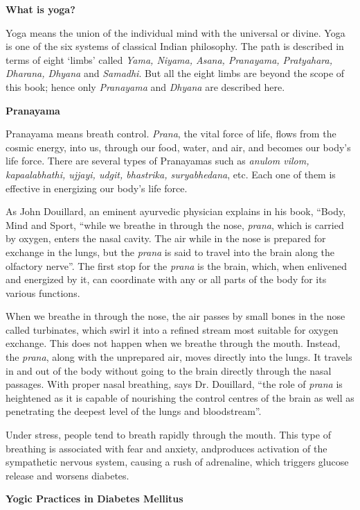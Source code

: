 \noindent\textbf{What is yoga?}

Yoga means the union of the individual mind with the universal or divine. Yoga is one of the six systems of classical Indian philo\-sophy. The path is described in terms of eight ‘limbs’ called \textit{Yama, Niyama, Asana, Pranayama, Pratyahara, Dharana, Dhyana} and \textit{Samadhi}. But all the eight limbs are beyond the scope of this book; hence only \textit{Pranayama} and \textit{Dhyana} are described here.

\noindent\textbf{Pranayama}

Pranayama means breath control. \textit{Prana}, the vital force of life, flows from the cosmic energy, into us, through our food, water, and air, and becomes our body’s life force. There are several types of Pranayamas such as \textit{anulom vilom, kapaalabhathi, ujjayi, udgit, bhastrika, suryabhedana}, etc. Each one of them is effective in energizing our body’s life force.

As John Douillard, an eminent ayurvedic physician explains in his book, “Body, Mind and Sport, “while we breathe in through the nose, \textit{prana}, which is carried by oxygen, enters the nasal cavity. The air while in the nose is prepared for exchange in the lungs, but the \textit{prana} is said to travel into the brain along the olfactory nerve”. The first stop for the \textit{prana} is the brain, which, when enlivened and energized by it, can coordinate with any or all parts of the body for its various functions.

When we breathe in through the nose, the air passes by small bones in the nose called turbinates, which swirl it into a refined stream most suitable for oxygen exchange. This does not happen when we breathe through the mouth. Instead, the \textit{prana}, along with the unprepared air, moves directly into the lungs. It travels in and out of the body without going to the brain directly through the nasal passages. With proper nasal breathing, says Dr. Douillard, “the role of \textit{prana} is heightened as it is capable of nourishing the control centres of the brain as well as penetrating the deepest level of the lungs and bloodstream”.

Under stress, people tend to breath rapidly through the mouth. This type of breathing is associated with fear and anxiety, and\break produces activation of the sympathetic nervous system, causing a rush of adrenaline, which triggers glucose release and worsens diabetes.

\noindent\textbf{Yogic Practices in Diabetes Mellitus}


